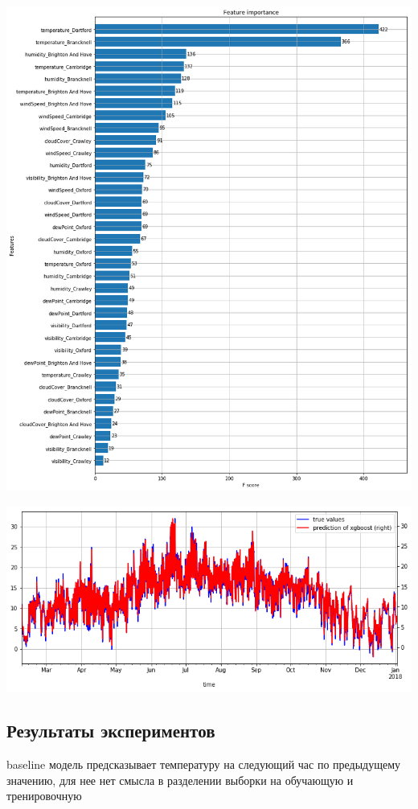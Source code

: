 \documentclass[11pt]{article}
\begin{document}
\begin{center}
\includegraphics[width=15cm]{./pics/xgboost_feature_importance_6_cities.png}
\end{center}


\begin{center}
\includegraphics[width=15cm]{./pics/xgboost_predictions_3_cities.png}
\end{center}

\subsection{Результаты экспериментов}
\label{sec:org61b6a81}
baseline модель предсказывает температуру на следующий час по предыдущему значению, для нее нет смысла в разделении
выборки на обучающую и тренировочную
\end{document}
